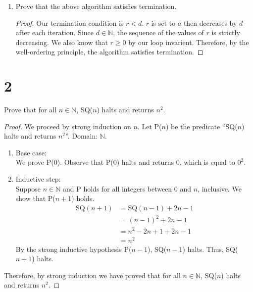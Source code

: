 \documentclass[11pt]{scrartcl}
\begin{document}
\begin{enumerate}[label=\alph*.]
{\begin{proof}
		$n$th iteration, which is when $r < d$. 
		By our loop invarient, we have that $r \geq 0$. Combining the two statements
		above, we get $0 \leq r < d$. Also by our loop invariant, we have $a = dq + r$. 
		Therefore, this algorithm satisfies partial correctness.
		\end{proof}
	}
	\item{
		Prove that the above algorithm satisfies termination.
		\begin{proof}
			Our termination condition is $r < d$. $r$ is set to $a$ then decreases by 
			$d$ after each iteration. Since $d \in \mathbb{N}$, the sequence of the values of $r$ is 
			strictly decreasing. We also know that $r \geq 0$ by our loop invarient.
			Therefore, by the well-ordering principle, the algorithm satisfies termination.
		\end{proof}
	}
\end{enumerate}


\section{2}
Prove that for all $n \in \mathbb{N}$, SQ($n$) halts and returns $n^2$.
\begin{proof}
	We proceed by strong induction on $n$. Let P($n$) be the predicate 
	“SQ($n$) halts and returns $n^2$”. Domain: $\mathbb{N}$.
	\begin{enumerate}[label=\alph*.]
		\item{
			Base case:\\
			We prove P($0$). Observe that P($0$) halts and returns $0$, which is equal to $0^2$.
		}
		\item{
			Inductive step:\\
			Suppose $n \in \mathbb{N}$ and P holds for all integers between 0 and $n$, inclusive. 
			We show that P($n+1$) holds.
			\begin{align*}
				\text{SQ}(n+1)  & = \text{SQ}(n-1) + 2n - 1 \\
								& = (n-1)^2 + 2n - 1 \tag{Strong inductive hypothesis}\\
								& = n^2 -2n + 1 + 2n -1\\
								& = n^2
			\end{align*}
			By the strong inductive hypothesis P($n-1$), SQ($n-1$) halts. Thus, SQ($n+1$) halts.
		}
	\end{enumerate}
	Therefore, by strong induction we have proved that for all $n \in \mathbb{N}$, SQ($n$) halts and returns $n^2$.
\end{proof}
\end{document}
